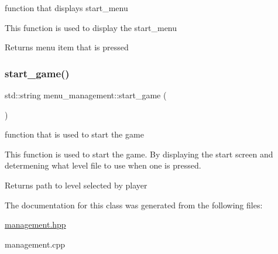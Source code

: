 function that displays start\+\_\+menu 

This function is used to display the start\+\_\+menu

\begin{DoxyReturn}{Returns}
menu item that is pressed 
\end{DoxyReturn}
\mbox{\label{classmenu__management_a92d22f059d33ccc5c3ae485804fd5fbb}} 
\subsubsection{\texorpdfstring{start\+\_\+game()}{start\_game()}}
{\footnotesize\ttfamily std\+::string menu\+\_\+management\+::start\+\_\+game (\begin{DoxyParamCaption}{ }\end{DoxyParamCaption})}



function that is used to start the game 

This function is used to start the game. By displaying the start screen and determening what level file to use when one is pressed.

\begin{DoxyReturn}{Returns}
path to level selected by player 
\end{DoxyReturn}


The documentation for this class was generated from the following files\+:\begin{DoxyCompactItemize}
\item 
\hyperlink{management_8hpp}{management.\+hpp}\item 
management.\+cpp\end{DoxyCompactItemize}

